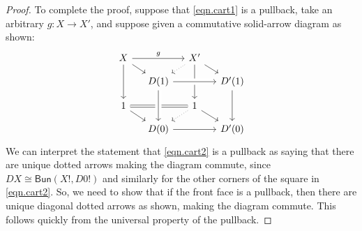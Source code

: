 \documentclass[11pt, article, one side]{memoir}
\theoremstyle{theorem}
\theoremstyle{definition}
\theoremstyle{remark}
\newcommand{\Cat}[1]{\mathsf{#1}}%
\newcommand{\bun}{\Cat{Bun}}
\begin{document}
\begin{proof}
To complete the proof, suppose that \cref{eqn.cart1} is a pullback, take an arbitrary $g\colon X\to X'$, and suppose given a commutative solid-arrow diagram as shown:
\[
\begin{tikzcd}[sep=small]
  X\ar[rr, "g"]\ar[dd]\ar[rd]&&
  X'\ar[dr]\ar[dd]\ar[dl, dotted]\\&
  D(1)\ar[rr, crossing over]&&
  D'(1)\ar[dd]\\
  1\ar[dr]\ar[rr, equal]&&
  1\ar[dr]\ar[dl, dotted]\\&
  D(0)\ar[from=uu, crossing over]\ar[rr]&&
  D'(0)
\end{tikzcd}
\]
We can interpret the statement that \cref{eqn.cart2} is a pullback as saying that there are unique dotted arrows making the diagram commute, since $DX \cong \bun(X!,  D0!)$ and similarly for the other corners of the square in \cref{eqn.cart2}. So, we need to show that if the front face is a pullback, then there are unique diagonal dotted arrows as shown, making the diagram commute. This follows quickly from the universal property of the pullback.
%
%
%
%
%
%
%
%

\end{proof}
\end{document}
